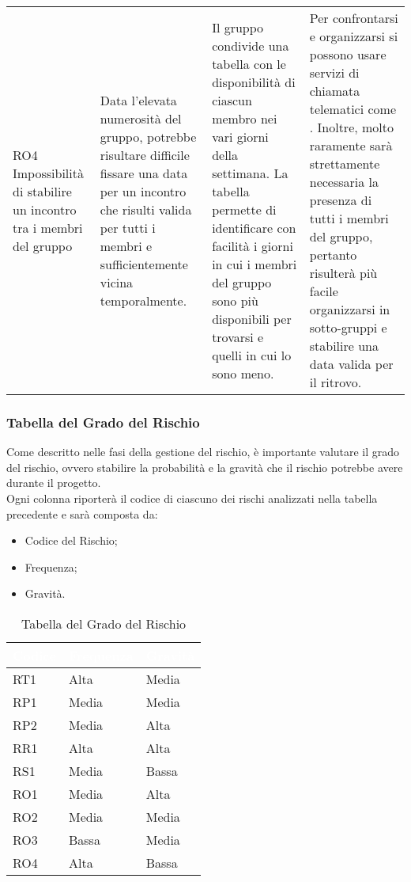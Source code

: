 {\begin{longtable}{ C{2cm} C{4cm} C{4cm} C{4.9cm}}
RO4 \newline Impossibilità di stabilire un incontro tra i membri del gruppo &
Data l'elevata numerosità del gruppo, potrebbe risultare difficile fissare una data per un incontro che risulti valida per tutti i membri e sufficientemente vicina temporalmente. &
Il gruppo condivide una tabella con le disponibilità di ciascun membro nei vari giorni della settimana. La tabella permette di identificare con facilità i giorni in cui i membri del gruppo sono più disponibili per trovarsi e quelli in cui lo sono meno. &
Per confrontarsi e organizzarsi si possono usare servizi di chiamata telematici come . Inoltre, molto raramente sarà strettamente necessaria la presenza di tutti i membri del gruppo, pertanto risulterà più facile organizzarsi in sotto-gruppi e stabilire una data valida per il ritrovo. \\

\end{longtable}
}

\subsubsection{Tabella del Grado del Rischio}
Come descritto nelle fasi della gestione del rischio, è importante valutare il grado del rischio, ovvero stabilire la probabilità e la gravità che il rischio potrebbe avere durante il progetto.\\
Ogni colonna riporterà il codice di ciascuno dei rischi analizzati nella tabella precedente e sarà composta da:
\begin{itemize}
	\item Codice del Rischio;
	\item Frequenza;
	\item Gravità.
\end{itemize}

{
\renewcommand{\arraystretch}{2}
\centering
	
\begin{longtable}{C{2cm} C{3cm} C{3cm}}
\caption{Tabella del Grado del Rischio}\\

\textcolor{white}{\textbf{Codice}} & 
\textcolor{white}{\textbf{Frequenza}} & 
\textcolor{white}{\textbf{Gravità}}\\	
\endhead

RT1 &  Alta & Media \\
RP1 & Media & Media \\
RP2 & Media &  Alta \\
RR1 &  Alta &  Alta \\
RS1 & Media & Bassa \\
RO1 & Media &  Alta \\
RO2 & Media & Media \\
RO3 & Bassa & Media \\
RO4 &  Alta & Bassa \\

\end{longtable}
}

